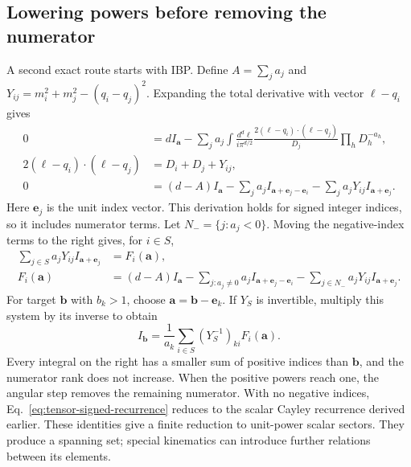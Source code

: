 \subsection{Lowering powers before removing the numerator}
A second exact route starts with IBP. Define $A=\sum_j a_j$ and $Y_{ij}=m_i^2+m_j^2-(q_i-q_j)^2$. Expanding the total derivative with vector $\ell-q_i$ gives
\begin{align}
 0&=d I_{\boldsymbol a}
 -\sum_j a_j\int\frac{d^d\ell}{i\pi^{d/2}}
 \frac{2(\ell-q_i)\cdot(\ell-q_j)}{D_j}\prod_hD_h^{-a_h},\\
 2(\ell-q_i)\cdot(\ell-q_j)&=D_i+D_j+Y_{ij},\\
 0&=(d-A)I_{\boldsymbol a}
 -\sum_j a_j I_{\boldsymbol a+\boldsymbol e_j-\boldsymbol e_i}
 -\sum_j a_jY_{ij}I_{\boldsymbol a+\boldsymbol e_j}.
 \label{eq:tensor-ibp}
\end{align}
Here $\boldsymbol e_j$ is the unit index vector. This derivation holds for signed integer indices, so it includes numerator terms. Let $N_- =\{j:a_j<0\}$. Moving the negative-index terms to the right gives, for $i\in S$,
\begin{align}
 \sum_{j\in S}a_jY_{ij}I_{\boldsymbol a+\boldsymbol e_j}&=F_i(\boldsymbol a),\\
 F_i(\boldsymbol a)&=(d-A)I_{\boldsymbol a}
 -\sum_{j:a_j\ne0}a_j I_{\boldsymbol a+\boldsymbol e_j-\boldsymbol e_i}
 -\sum_{j\in N_-}a_jY_{ij}I_{\boldsymbol a+\boldsymbol e_j}.
 \label{eq:tensor-signed-system}
\end{align}
For target $\boldsymbol b$ with $b_k>1$, choose $\boldsymbol a=\boldsymbol b-\boldsymbol e_k$. If $Y_S$ is invertible, multiply this system by its inverse to obtain
\begin{equation}
 I_{\boldsymbol b}=\frac{1}{a_k}
 \sum_{i\in S}(Y_S^{-1})_{ki}F_i(\boldsymbol a).
 \label{eq:tensor-signed-recurrence}
\end{equation}
Every integral on the right has a smaller sum of positive indices than $\boldsymbol b$, and the numerator rank does not increase. When the positive powers reach one, the angular step removes the remaining numerator. With no negative indices, Eq.~\eqref{eq:tensor-signed-recurrence} reduces to the scalar Cayley recurrence derived earlier. These identities give a finite reduction to unit-power scalar sectors. They produce a spanning set; special kinematics can introduce further relations between its elements.

